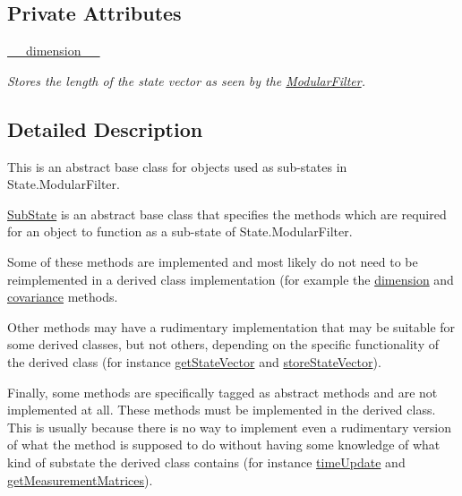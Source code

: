 \subsection*{Private Attributes}
\begin{DoxyCompactItemize}
\item 
\hyperlink{classmodest_1_1substates_1_1substate_1_1SubState_a5b1c0756a69da7f293a415c7d2d77843}{\+\_\+\+\_\+dimension\+\_\+\+\_\+}
\begin{DoxyCompactList}\small\item\em Stores the length of the state vector as seen by the \hyperlink{namespacemodest_1_1ModularFilter}{Modular\+Filter}. \end{DoxyCompactList}\end{DoxyCompactItemize}


\subsection{Detailed Description}
This is an abstract base class for objects used as sub-\/states in State.\+Modular\+Filter. 

\hyperlink{classmodest_1_1substates_1_1substate_1_1SubState}{Sub\+State} is an abstract base class that specifies the methods which are required for an object to function as a sub-\/state of State.\+Modular\+Filter.

Some of these methods are implemented and most likely do not need to be reimplemented in a derived class implementation (for example the \hyperlink{classmodest_1_1substates_1_1substate_1_1SubState_ab9027f6d1d7d57c47731612f519b7ee6}{dimension} and \hyperlink{classmodest_1_1substates_1_1substate_1_1SubState_a6e308aadd13962e476d2892ec728e3a5}{covariance} methods.

Other methods may have a rudimentary implementation that may be suitable for some derived classes, but not others, depending on the specific functionality of the derived class (for instance \hyperlink{classmodest_1_1substates_1_1substate_1_1SubState_aa18c8238415131b4b63cef0e4b2ff9fd}{get\+State\+Vector} and \hyperlink{classmodest_1_1substates_1_1substate_1_1SubState_a3644149dc4cc19c0e32d0b7040998c96}{store\+State\+Vector}).

Finally, some methods are specifically tagged as abstract methods and are not implemented at all. These methods must be implemented in the derived class. This is usually because there is no way to implement even a rudimentary version of what the method is supposed to do without having some knowledge of what kind of substate the derived class contains (for instance \hyperlink{classmodest_1_1substates_1_1substate_1_1SubState_a06d147fa5babe4e147b3267e67054ab4}{time\+Update} and \hyperlink{classmodest_1_1substates_1_1substate_1_1SubState_a98901b80c96264945362ec50b489a636}{get\+Measurement\+Matrices}).

